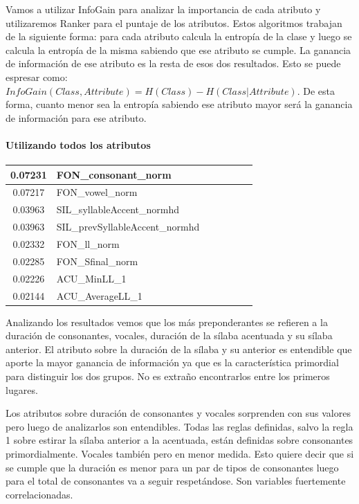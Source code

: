 \documentclass[11pt,a4paper,twoside]{tesis}
\begin{document}
Vamos a utilizar InfoGain para analizar la importancia de cada atributo y utilizaremos Ranker para el puntaje de los atributos. Estos algoritmos trabajan de la siguiente forma: para cada atributo calcula la entropía de la clase y luego se calcula la entropía de la misma sabiendo que ese atributo se cumple. La ganancia de información de ese atributo es la resta de esos dos resultados. Esto se puede espresar como: $InfoGain(Class,Attribute) = H(Class) - H(Class | Attribute)$. De esta forma, cuanto menor sea la entropía sabiendo ese atributo mayor será la ganancia de información para ese atributo.

\paragraph*{Utilizando todos los atributos}

\begin{table}[H]
\centering
\begin{tabular}{|c|l|c|c|c|c|c|}
\hline
 0.07231     & FON\_consonant\_norm \\ \hline
 0.07217     & FON\_vowel\_norm \\ \hline
 0.03963     & SIL\_syllableAccent\_normhd \\ \hline
 0.03963     & SIL\_prevSyllableAccent\_normhd \\ \hline
 0.02332     & FON\_ll\_norm \\ \hline
 0.02285     & FON\_Sfinal\_norm \\ \hline
 0.02226     & ACU\_MinLL\_1 \\ \hline
 0.02144     & ACU\_AverageLL\_1 \\ \hline
 
\end{tabular}
\end{table}

Analizando los resultados vemos que los más preponderantes se refieren a la duración de consonantes, vocales, duración de la sílaba acentuada y su sílaba anterior. El atributo sobre la duración de la sílaba y su anterior es entendible que aporte la mayor ganancia de información ya que es la característica primordial para distinguir los dos grupos. No es extraño encontrarlos entre los primeros lugares. 

Los atributos sobre duración de consonantes y vocales sorprenden con sus valores pero luego de analizarlos son entendibles. Todas las reglas definidas, salvo la regla 1 sobre estirar la sílaba anterior a la acentuada, están definidas sobre consonantes primordialmente. Vocales también pero en menor medida. Esto quiere decir que si se cumple que la duración es menor para un par de tipos de consonantes luego para el total de consonantes va a seguir respetándose. Son variables fuertemente correlacionadas. 
\end{document}
